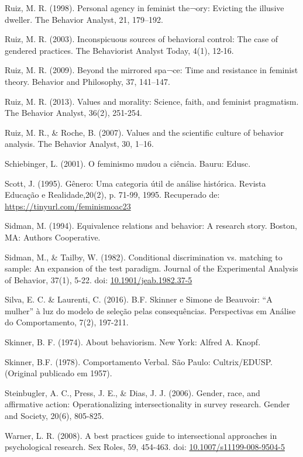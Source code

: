 \hangindent=25pt
\noindent Ruiz, M. R. (1998). Personal agency in feminist the¬ory: Evicting the illusive dweller. The Behavior Analyst, 21, 179–192.

\hangindent=25pt
\noindent Ruiz, M. R. (2003). Inconspicuous sources of behavioral control: The case of gendered practices. The Behaviorist Analyst Today, 4(1), 12-16. 

\hangindent=25pt
\noindent Ruiz, M. R. (2009). Beyond the mirrored spa¬ce: Time and resistance in feminist theory. Behavior and Philosophy, 37, 141–147.

\hangindent=25pt
\noindent Ruiz, M. R. (2013). Values and morality: Science, faith, and feminist pragmatism. The Behavior Analyst, 36(2), 251-254. 

\hangindent=25pt
\noindent Ruiz, M. R., \& Roche, B. (2007). Values and the scientific culture of behavior analysis. The Behavior Analyst, 30, 1–16.

\hangindent=25pt
\noindent Schiebinger, L. (2001). O feminismo mudou a ciência. Bauru: Edusc.

\hangindent=25pt
\noindent Scott, J. (1995). Gênero: Uma categoria útil de análise histórica. Revista Educação e Realidade,20(2), p. 71-99, 1995. Recuperado de: \url{https://tinyurl.com/feminismoac23}

\hangindent=25pt
\noindent Sidman, M. (1994). Equivalence relations and behavior: A research story. Boston, MA: Authors Cooperative.

\hangindent=25pt
\noindent Sidman, M., \& Tailby, W. (1982). Conditional discrimination vs. matching to sample: An expansion of the test paradigm. Journal of the Experimental Analysis of Behavior, 37(1), 5-22. doi: \url{10.1901/jeab.1982.37-5}

\hangindent=25pt
\noindent Silva, E. C. \& Laurenti, C. (2016). B.F. Skinner e Simone de Beauvoir: ``A mulher'' à luz do modelo de seleção pelas consequências. Perspectivas em Análise do Comportamento, 7(2), 197-211.

\hangindent=25pt
\noindent Skinner, B. F. (1974). About behaviorism. New York: Alfred A. Knopf.

\hangindent=25pt
\noindent Skinner, B.F. (1978). Comportamento Verbal. São Paulo: Cultrix/EDUSP. (Original publicado em 1957).

\hangindent=25pt
\noindent Steinbugler, A. C., Press, J. E., \& Dias, J. J. (2006). Gender, race, and affirmative action: Operationalizing intersectionality in survey research. Gender and Society, 20(6), 805-825.

\hangindent=25pt
\noindent Warner, L. R. (2008). A best practices guide to intersectional approaches in psychological research. Sex Roles, 59, 454-463. doi: \url{10.1007/s11199-008-9504-5}
